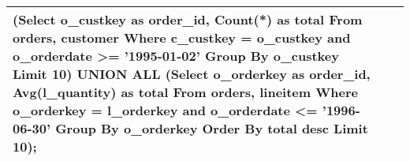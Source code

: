 {\begin{longtable}{|p{0.5cm}|p{7cm}|p{7cm}|}
(Select o\_custkey as order\_id, Count(*) as total From orders, customer Where c\_custkey = o\_custkey and o\_orderdate  >= '1995-01-02' Group By o\_custkey Limit 10)  UNION ALL  (Select o\_orderkey as order\_id, Avg(l\_quantity) as total From orders, lineitem Where o\_orderkey = l\_orderkey and o\_orderdate  <= '1996-06-30' Group By o\_orderkey Order By total desc Limit 10);\\\hline
\end{longtable}}